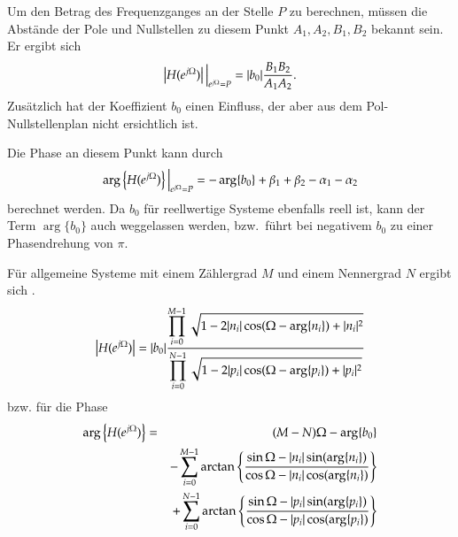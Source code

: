 Um den Betrag des Frequenzganges an der Stelle $P$ zu berechnen,
müssen die Abstände der Pole und Nullstellen zu diesem Punkt $A_1,
A_2,B_1,B_2$ bekannt sein. Er ergibt sich
\begin{equation}\label{eq:spec:EInfacheBetragsrechnung}
    \left|H (e^{j\Omega})\right|\Big|_{e^{j\Omega} = P} = |b_0| \frac{B_1 B_2}{A_1
    A_2}.
\end{equation}
Zusätzlich hat der Koeffizient $b_0$ einen Einfluss, der aber aus
dem Pol-Nullstellenplan nicht ersichtlich ist.

Die Phase an diesem Punkt kann durch
\begin{equation}\label{eq:spec:EenfachePhasenrechnung}
    \arg\left\{H (e^{j\Omega}) \right\}\Big|_{e^{j\Omega} = P} = -\arg\{b_0\}  + \beta_1 + \beta_2
    - \alpha_1 - \alpha_2
\end{equation}
berechnet werden. Da $b_0$ für reellwertige Systeme ebenfalls
reell ist, kann der Term $\arg\{b_0\}$ auch weggelassen werden, bzw.~führt bei negativem
$b_0$ zu einer Phasendrehung von $\pi$.

Für allgemeine Systeme mit einem Zählergrad $M$ und einem
Nennergrad $N$ ergibt sich \cite{KK98}.
\begin{equation}\label{eq:SpektrumBetragAllg}
    \left|H (e^{j\Omega})\right| = |b_0| \frac{\displaystyle \prod_{i = 0}^{M-1} \sqrt{1-2|n_i|\cos(\Omega-\arg\{n_i\})+|n_i|^2}}
    {\displaystyle \prod_{i = 0}^{N-1}\sqrt{1-2|p_i|\cos(\Omega-\arg\{p_i\})+|p_i|^2}}
\end{equation}
bzw. für die Phase
\begin{eqnarray}\label{eq:SpektrumPhaseAllg}
    \arg\left\{H (e^{j\Omega})\right\} &=& (M-N)\Omega - \arg\{b_0\} \\\nonumber
    && - \sum_{i = 0}^{M-1}\arctan\left\{\frac{\sin \Omega-|n_i|\sin(\arg\{n_i\})}{\cos \Omega-|n_i|\cos(\arg\{n_i\})}
    \right\}\\\nonumber
    && +\sum_{i = 0}^{N-1}\arctan\left\{\frac{\sin \Omega-|p_i|\sin(\arg\{p_i\})}{\cos \Omega-|p_i|\cos(\arg\{p_i\})} \right\}
\end{eqnarray}



